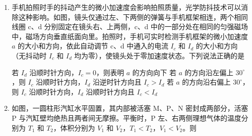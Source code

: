 \documentclass[\gkver]{gaokaozhenti}
\begin{document}
\begin{enumerate}
{D．空气中 $\lambda_{0} = \frac{v}{f}$，在水中 $\lambda = \frac{v'}{f}$，其中声音的速度只与介质有关，即在水中它们的速度大小也一样，则可得到波长的改变量为 $\Delta\lambda = \frac{v' - v}{f}$。可知频率越小其对应的波长改变量越大，D 正确。

故选 AD。
}

\item
手机拍照时手的抖动产生的微小加速度会影响拍照质量，光学防抖技术可以消除这种影响。如图，镜头仅通过左、下两侧的弹簧与手机框架相连，两个相同线圈 c、d 分别固定在镜头右、上两侧，c、d 中的一部分处在相同的匀强磁场中，磁场方向垂直纸面向里。拍照时，手机可实时检测手机框架的微小加速度 $a$ 的大小和方向，依此自动调节 c、d 中通入的电流 $I_{c}$ 和 $I_{d}$ 的大小和方向（无抖动时 $I_{c}$ 和 $I_{d}$ 均为零），使镜头处于零加速度状态。下列说法正确的是


{若 $I_{d}$ 沿顺时针方向，$I_{c} = 0$，则表明 $a$ 的方向向下}
{若 $a$ 的方向沿左偏上 $30^\circ$，则 $I_{c}$ 沿顺时针方向，$I_{d}$ 沿逆时针方向且 $I_{c} > I_{d}$}
{若 $a$ 的方向沿右偏上 $30^\circ$，则 $I_{c}$ 沿顺时针方向，$I_{d}$ 沿顺时针方向且 $I_{c} < I_{d}$}


\item
如图，一圆柱形汽缸水平固置，其内部被活塞 M、P、N 密封成两部分，活塞 P 与汽缸壁均绝热且两者间无摩擦。平衡时，P 左、右两侧理想气体的温度分别为 $T_{1}$ 和 $T_{2}$，体积分别为 $V_{1}$ 和 $V_{2}$，$T_{1} < T_{2}$，$V_{1} < V_{2}$。则


\end{enumerate}
\end{document}
